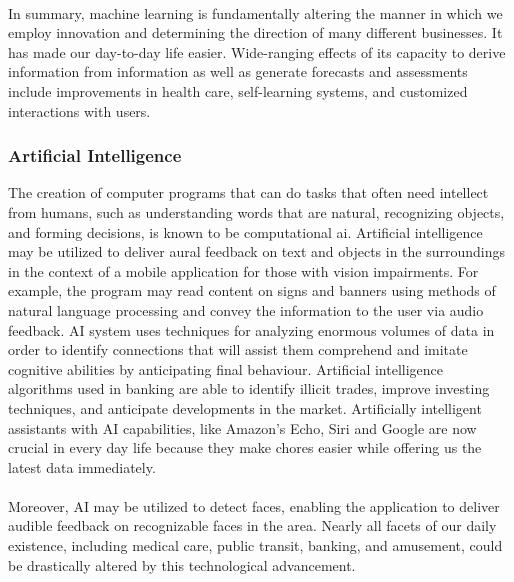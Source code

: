 \documentclass[MScCS]{uccthesis}
\begin{document}
\\In summary, machine learning is fundamentally altering the manner in which we employ innovation and determining the direction of many different businesses. It has made our day-to-day life easier. Wide-ranging effects of its capacity to derive information from information as well as generate forecasts and assessments include improvements in health care, self-learning systems, and customized interactions with users. 

\subsubsection{Artificial Intelligence}
The creation of computer programs that can do tasks that often need intellect from humans, such as understanding words that are natural, recognizing objects, and forming decisions, is known to be computational ai. Artificial intelligence may be utilized to deliver aural feedback on text and objects in the surroundings in the context of a mobile application for those with vision impairments. For example, the program may read content on signs and banners using methods of natural language processing and convey the information to the user via audio feedback. AI system uses techniques for analyzing enormous volumes of data in order to identify connections that will assist them comprehend and imitate cognitive abilities by anticipating final behaviour. Artificial intelligence algorithms used in banking are able to identify illicit trades, improve investing techniques, and anticipate developments in the market. Artificially intelligent assistants with AI capabilities, like Amazon's Echo, Siri and Google are now crucial in every day life because they make chores easier while offering us the latest data immediately. \\
\\Moreover, AI may be utilized to detect faces, enabling the application to deliver audible feedback on recognizable faces in the area. Nearly all facets of our daily existence, including medical care, public transit, banking, and amusement, could be drastically altered by this technological advancement.\\
\\
\end{document}
